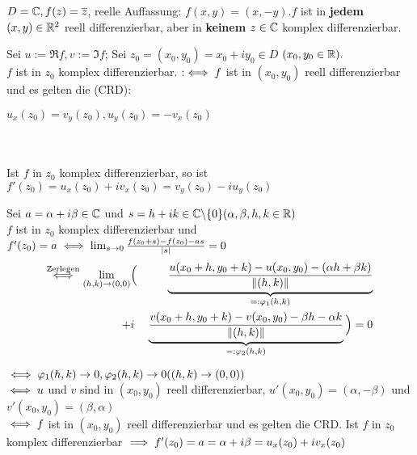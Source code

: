 \documentclass[a4paper,twoside,DIV15,BCOR12mm]{scrbook}
\def\gdw{\equizu}
\def\gdw{\equizu}
\begin{document}
\begin{beispiel}
$D = \mathbb{C}, f(z) = \overline{z}$, reelle Auffassung: $f(x,y) = (x, -y). f$ ist in \textbf{jedem} $(x,y) \in \mathbb{R} ^2$ reell differenzierbar, aber in \textbf{keinem} $z \in \mathbb{C}$ komplex differenzierbar.
\end{beispiel}

\begin{satz}
Sei $u:=\Re f, v:=\Im f$; Sei $z_0 = (x_0,y_0) = x_0 + iy_0 \in D $ $(x_0,y_0 \in \mathbb{R}).$ \\ $ f$ ist in $z_0$ komplex differenzierbar. $:\gdw f$ ist in $(x_0,y_0)$ reell differenzierbar und es gelten die  (CRD): \\
\centerline{$u_x(z_0) = v_y(z_0), u_y(z_0) = -v_x(z_0)$} \\ \\
Ist $f$ in $z_0$ komplex differenzierbar, so ist $f'(z_0) = u_x(z_0) + iv_x(z_0) = v_y(z_0) - iu_y(z_0)$
\end{satz}

\begin{beweis}
Sei $ a = \alpha + i\beta \in \mathbb{C}$ und $s = h + ik \in \mathbb{C} \backslash\{0\} (\alpha ,\beta ,h,k \in \mathbb{R} )$ \\
$f$ ist in $z_0$ komplex differenzierbar und $f'(z_0) = a \gdw \lim_{s \rightarrow 0} \frac{f(z_0 + s) - f(z_0) - as}{|s|} = 0$ \\
\begin{eqnarray}\notag \stackrel{\text{Zerlegen}}{\gdw} \lim_{(h,k) \rightarrow (0,0)} & \Big( &\underbrace{\frac{u(x_0+h,y_0+k) - u(x_0,y_0) - (\alpha h+\beta k)}{\|(h,k)\|}}_{=:\varphi _1(h,k)} \\ 
\notag + & i &\underbrace{\frac{v(x_0+h,y_0+k) - v(x_0,y_0) - \beta h - \alpha k}{\|(h,k)\|}}_{=:\varphi _2(h,k)}\Big) = 0
\end{eqnarray}

$\gdw \varphi _1 (h,k) \rightarrow 0, \varphi _2 (h,k) \rightarrow 0 ((h,k) \rightarrow (0,0))$ \\
$\gdw u$ und $v$ sind in $(x_0,y_0)$ reell differenzierbar, $u'(x_0,y_0) = (\alpha , -\beta)$ und $v'(x_0,y_0) = (\beta ,\alpha)$ \\
$\gdw f$ ist in $(x_0,y_0)$ reell differenzierbar und es gelten die CRD. Ist $f$ in $z_0$ komplex differenzierbar $\implies f'(z_0) = a = \alpha + i\beta = u_x(z_0) + iv_x(z_0)$
\end{beweis}
\end{document}

